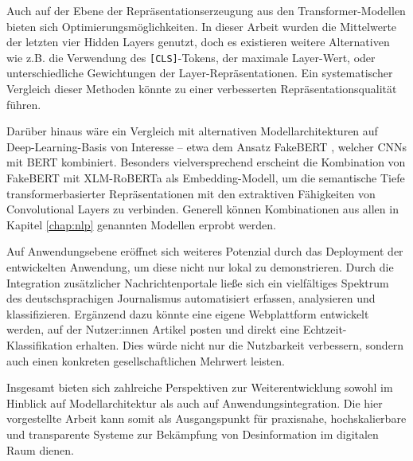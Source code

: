 Auch auf der Ebene der Repräsentationserzeugung aus den Transformer-Modellen bieten sich Optimierungsmöglichkeiten. 
In dieser Arbeit wurden die Mittelwerte der letzten vier Hidden Layers genutzt, doch es existieren weitere Alternativen wie z.B. die Verwendung des 
\texttt{[CLS]}-Tokens, der maximale Layer-Wert, oder unterschiedliche Gewichtungen der Layer-Repräsentationen. 
Ein systematischer Vergleich dieser Methoden könnte zu einer verbesserten Repräsentationsqualität führen.

Darüber hinaus wäre ein Vergleich mit alternativen Modellarchitekturen auf Deep-Learning-Basis von Interesse – etwa dem Ansatz FakeBERT \cite{Kaliyar:2021aa}, 
welcher CNNs mit BERT kombiniert. Besonders vielversprechend erscheint die Kombination von FakeBERT mit XLM-RoBERTa als Embedding-Modell,
um die semantische Tiefe transformerbasierter Repräsentationen mit den extraktiven Fähigkeiten von Convolutional Layers zu verbinden.
Generell können Kombinationen aus allen in Kapitel \ref{chap:nlp} genannten Modellen erprobt werden.

Auf Anwendungsebene eröffnet sich weiteres Potenzial durch das Deployment der entwickelten Anwendung, um diese nicht nur lokal zu demonstrieren.
Durch die Integration zusätzlicher Nachrichtenportale ließe sich ein vielfältiges Spektrum des deutschsprachigen Journalismus automatisiert erfassen, 
analysieren und klassifizieren.
Ergänzend dazu könnte eine eigene Webplattform entwickelt werden, auf der Nutzer:innen Artikel posten und direkt eine Echtzeit-Klassifikation 
erhalten. Dies würde nicht nur die Nutzbarkeit verbessern, sondern auch einen konkreten gesellschaftlichen Mehrwert leisten.

Insgesamt bieten sich zahlreiche Perspektiven zur Weiterentwicklung sowohl im Hinblick auf Modellarchitektur als auch auf Anwendungsintegration. 
Die hier vorgestellte Arbeit kann somit als Ausgangspunkt für praxisnahe, hochskalierbare und transparente Systeme zur Bekämpfung von Desinformation 
im digitalen Raum dienen.

